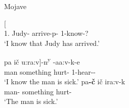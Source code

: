\begin{exe}\ex\label{MojComp} {Mojave} \citep[274, 220]{Munro:1976}
\begin{xlist}
\ex\gll{}  {\rm[} \textipa{iva:-p-m}{\rm]} \\
1\sg{}.\nom{} Judy-\nom{} arrive-p-\dsbj{} 1-know-?\\
`I know that Judy has arrived.'

\ex\gll  {\rm[}pa \textglotstop i\v c u:ra:v{\rm]}-n\textsuperscript{y} \textglotstop-a\textglotstop a:v-k-e\\
man something hurt-\dem{} 1-hear-\tns{}-\augv{}\\
`I know the man is sick.'
\ex\gll pa\textbf{-\v c} \textglotstop i\v c ira:v-k\\
man-\nom{} something hurt-\tns{}\\
`The man is sick.'
\end{xlist} 
\end{exe}


